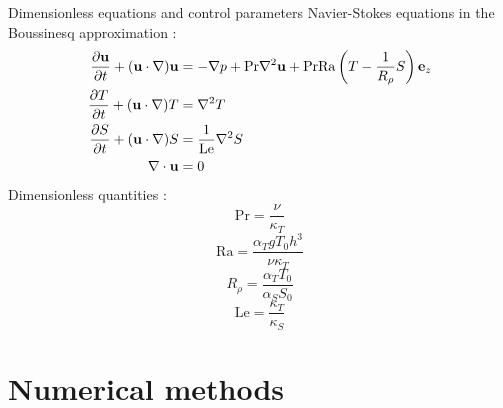 \documentclass[10pt]{beamer}
\def\Ra{\mathrm{Ra}}
\def\Pr{\mathrm{Pr}}
\def\Le{\mathrm{Le}}
\begin{document}
\begin{frame}{Dimensionless equations and control parameters}
  Navier-Stokes equations in the Boussinesq approximation :
  \begin{equation}\label{eq:ns}
    \begin{aligned}
      \frac{\partial\mathbf{u}}{\partial t} + (\mathbf{u}\cdot\nabla)\mathbf{u} & = -\nabla p + \Pr\nabla^2\mathbf{u} + \Pr\Ra\left(T - \frac{1}{R_{\rho}}S\right)\vf{e}_z \\
      \frac{\partial T}{\partial t} + (\mathbf{u}\cdot\nabla)T                  & = \nabla^2T                                                                              \\
      \frac{\partial S}{\partial t} + (\mathbf{u}\cdot\nabla)S                  & = \frac{1}{\Le}\nabla^2S                                                                 \\
      \nabla\cdot\mathbf{u}                                                     & = 0
    \end{aligned}
  \end{equation}
  Dimensionless quantities :
  \begin{equation}
    \Pr = \frac{\nu}{\kappa_T}
  \end{equation}
  \begin{equation}
    \Ra = \frac{\alpha_T g T_0 h^3}{\nu \kappa_T}
  \end{equation}
  \begin{equation}
    R_{\rho} = \frac{\alpha_T T_0}{\alpha_S S_0}
  \end{equation}
  \begin{equation}
    \Le = \frac{\kappa_T}{\kappa_S}
  \end{equation}
\end{frame}

\section{Numerical methods}
\end{document}
